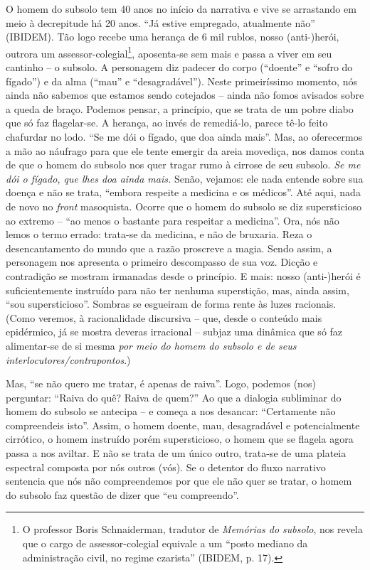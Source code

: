 O homem do subsolo tem 40 anos no início da narrativa e vive se
arrastando em meio à decrepitude há 20 anos. ``Já estive empregado,
atualmente não'' (IBIDEM). Tão logo recebe uma herança de 6 mil rublos,
nosso (anti-)herói, outrora um assessor-colegial\footnote{O professor
  Boris Schnaiderman, tradutor de \emph{Memórias do subsolo}, nos revela
  que o cargo de assessor-colegial equivale a um ``posto mediano da
  administração civil, no regime czarista'' (IBIDEM, p. 17).},
aposenta-se sem mais e passa a viver em seu cantinho -- o subsolo. A
personagem diz padecer do corpo (``doente'' e ``sofro do fígado'') e da
alma (``mau'' e ``desagradável''). Neste primeiríssimo momento, nós
ainda não sabemos que estamos sendo cotejados -- ainda não fomos
avisados sobre a queda de braço. Podemos pensar, a princípio, que se
trata de um pobre diabo que só faz flagelar-se. A herança, ao invés de
remediá-lo, parece tê-lo feito chafurdar no lodo. ``Se me dói o fígado,
que doa ainda mais''. Mas, ao oferecermos a mão ao náufrago para que ele
tente emergir da areia movediça, nos damos conta de que o homem do
subsolo nos quer tragar rumo à cirrose de seu subsolo. \emph{Se me dói o
fígado, que lhes doa ainda mais.} Senão, vejamos: ele nada entende sobre
sua doença e não se trata, ``embora respeite a medicina e os médicos''.
Até aqui, nada de novo no \emph{front} masoquista. Ocorre que o homem do
subsolo se diz supersticioso ao extremo -- ``ao menos o bastante para
respeitar a medicina''. Ora, nós não lemos o termo errado: trata-se da
medicina, e não de bruxaria. Reza o desencantamento do mundo que a razão
proscreve a magia. Sendo assim, a personagem nos apresenta o primeiro
descompasso de sua voz. Dicção e contradição se mostram irmanadas desde
o princípio. E mais: nosso (anti-)herói é suficientemente instruído para
não ter nenhuma superstição, mas, ainda assim, ``sou supersticioso''.
Sombras se esgueiram de forma rente às luzes racionais. (Como veremos, à
racionalidade discursiva -- que, desde o conteúdo mais epidérmico, já se
mostra deveras irracional -- subjaz uma dinâmica que só faz alimentar-se
de si mesma \emph{por meio do homem do subsolo e de seus
interlocutores/contrapontos}.)

Mas, ``se não quero me tratar, é apenas de raiva''. Logo, podemos (nos)
perguntar: ``Raiva do quê? Raiva de quem?'' Ao que a dialogia subliminar
do homem do subsolo se antecipa -- e começa a nos desancar: ``Certamente
não compreendeis isto''. Assim, o homem doente, mau, desagradável e
potencialmente cirrótico, o homem instruído porém supersticioso, o homem
que se flagela agora passa a nos aviltar. E não se trata de um único
outro, trata-se de uma plateia espectral composta por nós outros (vós).
Se o detentor do fluxo narrativo sentencia que nós não compreendemos por
que ele não quer se tratar, o homem do subsolo faz questão de dizer que
``eu compreendo''.


